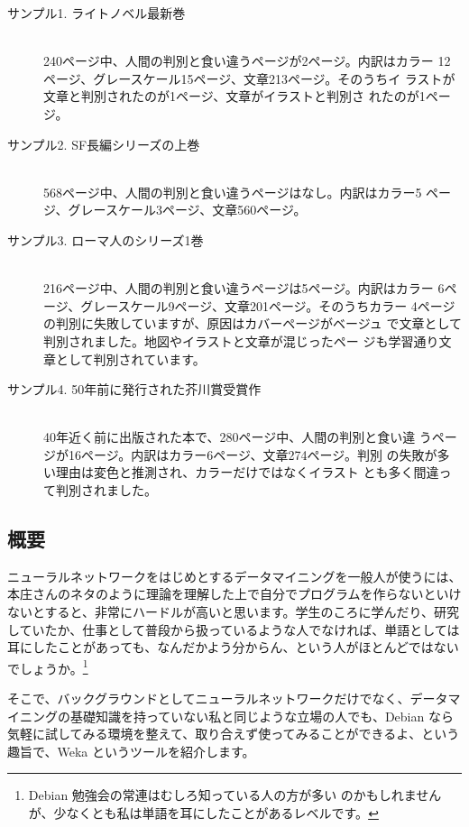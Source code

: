 \documentclass[mingoth,a4paper]{jsarticle}
\begin{document}
\begin{description}
 \item[サンプル1. ライトノベル最新巻] \mbox{}\\
    240ページ中、人間の判別と食い違うページが2ページ。内訳はカラー
    12ページ、グレースケール15ページ、文章213ページ。そのうちイ
    ラストが文章と判別されたのが1ページ、文章がイラストと判別さ
    れたのが1ページ。
 \item[サンプル2. SF長編シリーズの上巻] \mbox{}\\
    568ページ中、人間の判別と食い違うページはなし。内訳はカラー5
    ページ、グレースケール3ページ、文章560ページ。
 \item[サンプル3. ローマ人のシリーズ1巻] \mbox{}\\
    216ページ中、人間の判別と食い違うページは5ページ。内訳はカラー
    6ページ、グレースケール9ページ、文章201ページ。そのうちカラー
    4ページの判別に失敗していますが、原因はカバーページがベージュ
    で文章として判別されました。地図やイラストと文章が混じったペー
    ジも学習通り文章として判別されています。
 \item[サンプル4. 50年前に発行された芥川賞受賞作] \mbox{}\\
    40年近く前に出版された本で、280ページ中、人間の判別と食い違
    うページが16ページ。内訳はカラー6ページ、文章274ページ。判別
    の失敗が多い理由は変色と推測され、カラーだけではなくイラスト
    とも多く間違って判別されました。
\end{description}

\subsection{概要}

ニューラルネットワークをはじめとするデータマイニングを一般人が使うには、
本庄さんのネタのように理論を理解した上で自分でプログラムを作らないといけ
ないとすると、非常にハードルが高いと思います。学生のころに学んだり、研究
していたか、仕事として普段から扱っているような人でなければ、単語としては
耳にしたことがあっても、なんだかよう分からん、という人がほとんどではない
でしょうか。\footnote{Debian 勉強会の常連はむしろ知っている人の方が多い
のかもしれませんが、少なくとも私は単語を耳にしたことがあるレベルです。}

そこで、バックグラウンドとしてニューラルネットワークだけでなく、データマ
イニングの基礎知識を持っていない私と同じような立場の人でも、Debian なら
気軽に試してみる環境を整えて、取り合えず使ってみることができるよ、という
趣旨で、Weka というツールを紹介します。
\end{document}

